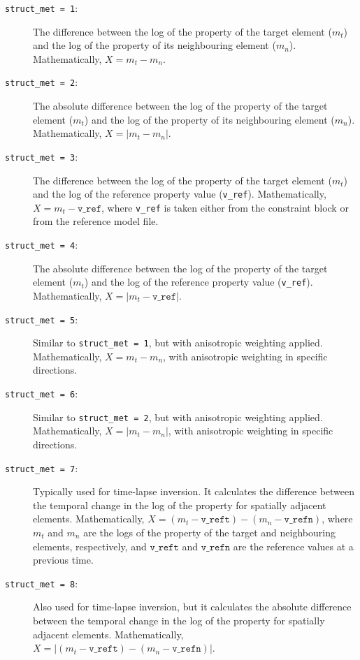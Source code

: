 \documentclass[a4paper,12pt]{article}
\begin{document}
\begin{description}
    \item[\texttt{struct\_met = 1}:] The difference between the log of the property of the target element (\( m_t \)) and the log of the property of its neighbouring element (\( m_n \)). Mathematically, \( X = m_t - m_n \).
    
    \item[\texttt{struct\_met = 2}:] The absolute difference between the log of the property of the target element (\( m_t \)) and the log of the property of its neighbouring element (\( m_n \)). Mathematically, \( X = |m_t - m_n| \).
    
    \item[\texttt{struct\_met = 3}:] The difference between the log of the property of the target element (\( m_t \)) and the log of the reference property value (\texttt{v\_ref}). Mathematically, \( X = m_t - \texttt{v\_ref} \), where \texttt{v\_ref} is taken either from the constraint block or from the reference model file.
    
    \item[\texttt{struct\_met = 4}:] The absolute difference between the log of the property of the target element (\( m_t \)) and the log of the reference property value (\texttt{v\_ref}). Mathematically, \( X = |m_t - \texttt{v\_ref}| \).
    
    \item[\texttt{struct\_met = 5}:] Similar to \texttt{struct\_met = 1}, but with anisotropic weighting applied. Mathematically, \( X = m_t - m_n \), with anisotropic weighting in specific directions.
    
    \item[\texttt{struct\_met = 6}:] Similar to \texttt{struct\_met = 2}, but with anisotropic weighting applied. Mathematically, \( X = |m_t - m_n| \), with anisotropic weighting in specific directions.
    
    \item[\texttt{struct\_met = 7}:] Typically used for time-lapse inversion. It calculates the difference between the temporal change in the log of the property for spatially adjacent elements. Mathematically, \( X = (m_t - \texttt{v\_reft}) - (m_n - \texttt{v\_refn}) \), where \( m_t \) and \( m_n \) are the logs of the property of the target and neighbouring elements, respectively, and \( \texttt{v\_reft} \) and \( \texttt{v\_refn} \) are the reference values at a previous time.
    
    \item[\texttt{struct\_met = 8}:] Also used for time-lapse inversion, but it calculates the absolute difference between the temporal change in the log of the property for spatially adjacent elements. Mathematically, \( X = |(m_t - \texttt{v\_reft}) - (m_n - \texttt{v\_refn})| \).
    

\end{description}
\end{document}
